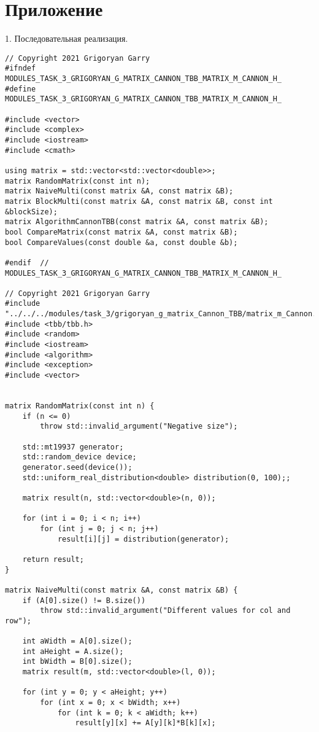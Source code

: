 \documentclass{report}
\begin{document}
\section*{Приложение}
\par 1. Последовательная реализация.
\begin{lstlisting}
// Copyright 2021 Grigoryan Garry
#ifndef MODULES_TASK_3_GRIGORYAN_G_MATRIX_CANNON_TBB_MATRIX_M_CANNON_H_
#define MODULES_TASK_3_GRIGORYAN_G_MATRIX_CANNON_TBB_MATRIX_M_CANNON_H_ 

#include <vector>
#include <complex>
#include <iostream>
#include <cmath>

using matrix = std::vector<std::vector<double>>;
matrix RandomMatrix(const int n);
matrix NaiveMulti(const matrix &A, const matrix &B);
matrix BlockMulti(const matrix &A, const matrix &B, const int &blockSize);
matrix AlgorithmCannonTBB(const matrix &A, const matrix &B);
bool CompareMatrix(const matrix &A, const matrix &B);
bool CompareValues(const double &a, const double &b);

#endif  // MODULES_TASK_3_GRIGORYAN_G_MATRIX_CANNON_TBB_MATRIX_M_CANNON_H_

// Copyright 2021 Grigoryan Garry
#include "../../../modules/task_3/grigoryan_g_matrix_Cannon_TBB/matrix_m_Cannon.h"
#include <tbb/tbb.h>
#include <random>
#include <iostream>
#include <algorithm>
#include <exception>
#include <vector>


matrix RandomMatrix(const int n) {
    if (n <= 0)
        throw std::invalid_argument("Negative size");

    std::mt19937 generator;
    std::random_device device;
    generator.seed(device());
    std::uniform_real_distribution<double> distribution(0, 100);;

    matrix result(n, std::vector<double>(n, 0));

    for (int i = 0; i < n; i++)
        for (int j = 0; j < n; j++)
            result[i][j] = distribution(generator);

    return result;
}

matrix NaiveMulti(const matrix &A, const matrix &B) {
    if (A[0].size() != B.size())
        throw std::invalid_argument("Different values for col and row");

    int aWidth = A[0].size();
    int aHeight = A.size();
    int bWidth = B[0].size();
    matrix result(m, std::vector<double>(l, 0));

    for (int y = 0; y < aHeight; y++)
        for (int x = 0; x < bWidth; x++)
            for (int k = 0; k < aWidth; k++)
                result[y][x] += A[y][k]*B[k][x];


\end{lstlisting}
\end{document}
